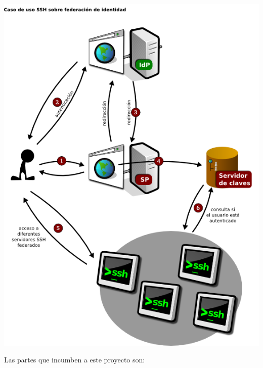     \begin{center}
        \includegraphics[width=\textwidth]{img/casodeuso1.png}
    \end{center}
    
    Las partes que incumben a este proyecto son:


